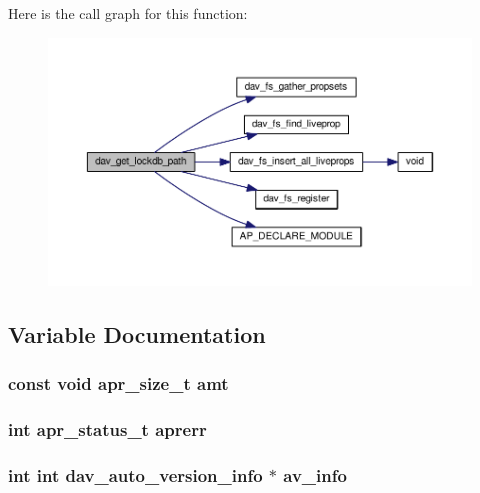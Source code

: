 Here is the call graph for this function\+:
\nopagebreak
\begin{figure}[H]
\begin{center}
\leavevmode
\includegraphics[width=350pt]{group__MOD__DAV_ga1f248f4f9123db972e69e6fbf5c330ef_cgraph}
\end{center}
\end{figure}




\subsection{Variable Documentation}
\subsubsection[{\texorpdfstring{amt}{amt}}]{ const {\bf void} {\bf apr\+\_\+size\+\_\+t} amt}\hypertarget{group__MOD__DAV_ga9d0b8ad7f59b3495f813810d33bc3664}{}\label{group__MOD__DAV_ga9d0b8ad7f59b3495f813810d33bc3664}
\subsubsection[{\texorpdfstring{aprerr}{aprerr}}]{ {\bf int} {\bf apr\+\_\+status\+\_\+t} aprerr}\hypertarget{group__MOD__DAV_gad6ab505736bdeb22c744ff1560e6504a}{}\label{group__MOD__DAV_gad6ab505736bdeb22c744ff1560e6504a}
\subsubsection[{\texorpdfstring{av\+\_\+info}{av_info}}]{ {\bf int} {\bf int} {\bf dav\+\_\+auto\+\_\+version\+\_\+info} $\ast$ av\+\_\+info}\hypertarget{group__MOD__DAV_ga9b9e3731681a56e2bf4dec3e3fb956a6}{}\label{group__MOD__DAV_ga9b9e3731681a56e2bf4dec3e3fb956a6}
